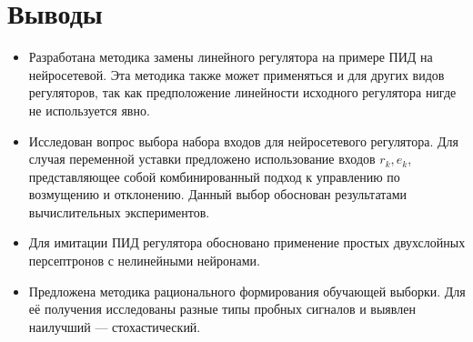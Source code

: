 \section{Выводы}

\begin{itemize}

\item Разработана методика замены линейного регулятора на примере ПИД
  на нейросетевой.  Эта методика также может применяться и для других
  видов регуляторов, так как предположение линейности исходного
  регулятора нигде не используется явно.

\item Исследован вопрос выбора набора входов для нейросетевого
  регулятора.  Для случая переменной уставки предложено использование
  входов $r_k,e_k$, представляющее собой комбинированный подход к
  управлению по возмущению и отклонению.  Данный выбор обоснован
  результатами вычислительных экспериментов.

\item Для имитации ПИД регулятора обосновано применение простых
  двухслойных персептронов с нелинейными нейронами.

\item Предложена методика рационального формирования обучающей
  выборки.  Для её получения исследованы разные типы пробных сигналов
  и выявлен наилучший --- стохастический.



\end{itemize}
